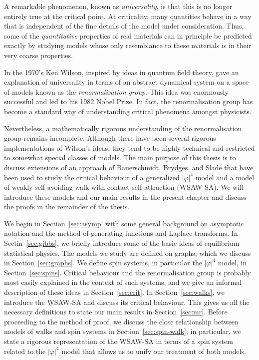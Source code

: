 A remarkable phenomenon, known as \emph{universality}, is that this is no longer
entirely true at the critical point. At criticality, many quantities behave in a
way that is independent of the fine details of the model under consideration. Thus,
some of the \emph{quantitative} properties of real materials can in principle be
predicted exactly by studying models whose only resemblance to these materials is
in their very coarse properties.

In the 1970's Ken Wilson, inspired by ideas in quantum field theory, gave an
explanation of universality in terms of an
abstract dynamical system on a space of models known as the \emph{renormalisation
group}. This idea was enormously successful and led to his 1982 Nobel Prize. In fact,
the renormalisation group has become a standard way of understanding critical phenomena
amongst physicists.

Nevertheless, a mathematically rigorous understanding of the renormalisation group
remains incomplete. Although there have been several rigorous implementations of
Wilson's ideas, they tend to be highly technical and restricted to somewhat special
classes of models. The main purpose of this thesis is to discuss extensions of an
approach of Bauerschmidt, Brydges, and Slade that have been used to study the
critical behaviour of a generalized $|\varphi|^4$ model and a model of weakly
self-avoiding walk with contact self-attraction (WSAW-SA). We will introduce these
models and our main results in the present chapter and discuss the proofs in the
remainder of the thesis.

We begin in Section~\ref{sec:asymp} with some general background on asymptotic
notation and the method of generating functions and Laplace transforms. In
Sectin~\ref{sec:gibbs}, we briefly introduce some of the basic ideas of equilibrium
statistical physics. The models we study are defined on graphs, which we
discuss in Section~\ref{sec:graphs}. We define spin systems, in particular
the $|\varphi|^4$ model, in Section~\ref{sec:spins}. Critical behaviour and
the renormalisation group is probably most easily explained in the context of such
systems, and we give an informal description of these ideas in Section~\ref{sec:crit}.
In Section~\ref{sec:walks},
we introduce the WSAW-SA and discuss its critical behaviour. This gives us all
the necessary definitions to state our main results in Section~\ref{sec:mr}.
Before proceeding to the method of proof,
we discuss the close relationship between models of walks and spin systems in
Section~\ref{sec:spin-walk}; in particular, we state a rigorous representation
of the WSAW-SA in terms of a spin system related to the $|\varphi|^4$ model
that allows us to unify our treatment of both models.

